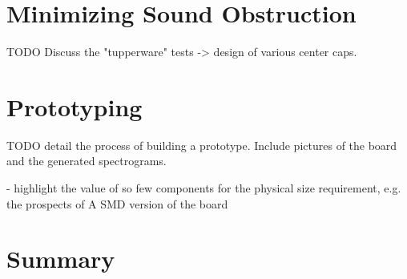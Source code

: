 \section{Minimizing Sound Obstruction}
TODO Discuss the "tupperware" tests -> design of various center caps.


\section{Prototyping}

TODO detail the process of building a prototype. Include pictures of the board and the generated spectrograms.

- highlight the value of so few components for the physical size requirement, e.g. the prospects of A SMD version of the board

\section{Summary}
